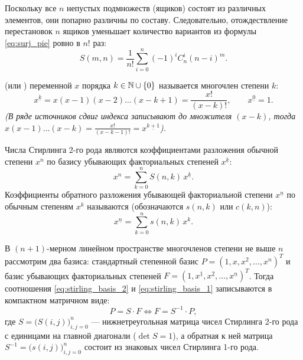 Поскольку все $n$ непустых подмножеств (ящиков) состоят из различных 
элементов, они попарно различны по составу. Следовательно, отождествление 
перестановок $n$ ящиков уменьшает количество вариантов из формулы 
\eqref{eq:surj_pie} ровно в $n!$ раз:
\begin{equation} \label{eq:stirling_2_def}
    S(m, n) = \frac{1}{n!} \sum_{i=0}^{n} (-1)^i C_n^i (n - i)^m. \tag{2}
\end{equation}

\begin{definition}
     (или ) переменной $x$ порядка $k \in \mathbb{N} \cup \{0\}$ называется 
    многочлен степени $k$:
    \begin{equation} \label{eq:falling_fact}
        x^{\underline{k}} = x(x - 1)(x - 2) \dots (x - k + 1) = 
        \frac{x!}{(x - k)!}, \qquad x^{\underline{0}} = 1. \tag{3}
    \end{equation}
    \emph{(В ряде источников сдвиг индекса записывают до множителя $(x - k)$, 
    тогда $x(x - 1)\dots(x - k) = \frac{x!}{(x - k - 1)!} = x^{\underline{k+1}}$).}
\end{definition}

\begin{theorem}
    Числа Стирлинга 2-го рода являются коэффициентами разложения обычной 
    степени $x^n$ по базису убывающих факториальных степеней 
    $x^{\underline{k}}$:
    \begin{equation} \label{eq:stirling_basis_2}
        x^n = \sum_{k=0}^{n} S(n, k) \, x^{\underline{k}}. \tag{4}
    \end{equation}
    Коэффициенты обратного разложения убывающей факториальной степени 
    $x^{\underline{n}}$ по обычным степеням $x^k$ называются 
     (обозначаются $s(n, k)$ или 
    $c(k, n)$):
    \begin{equation} \label{eq:stirling_basis_1}
        x^{\underline{n}} = \sum_{k=0}^{n} s(n, k) \, x^k. \tag{5}
    \end{equation}
\end{theorem}

\begin{remark}[\textbf{Матричная интерпретация $P = S \cdot F$}]
    В $(n + 1)$-мерном линейном пространстве многочленов степени не выше $n$ 
    рассмотрим два базиса: стандартный степенной базис 
    $P = (1, x, x^2, \dots, x^n)^T$ и базис убывающих факториальных 
    степеней $F = (1, x^{\underline{1}}, x^{\underline{2}}, \dots, 
    x^{\underline{n}})^T$. Тогда соотношения \eqref{eq:stirling_basis_2} и 
    \eqref{eq:stirling_basis_1} записываются в компактном матричном виде:
    \[
        P = S \cdot F \iff F = S^{-1} \cdot P,
    \]
    где $S = \bigl(S(i, j)\bigr)_{i,j=0}^n$ --- нижнетреугольная матрица 
    чисел Стирлинга 2-го рода с единицами на главной диагонали 
    ($\det S = 1$), а обратная к ней матрица $S^{-1} = \bigl(s(i, j)\bigr)_{i,j=0}^n$ 
    состоит из знаковых чисел Стирлинга 1-го рода.
\end{remark}

